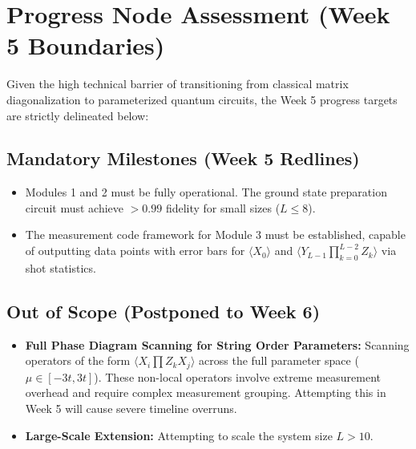 \documentclass[12pt, a4paper]{article}
\begin{document}
\section{Progress Node Assessment (Week 5 Boundaries)}
Given the high technical barrier of transitioning from classical matrix diagonalization to parameterized quantum circuits, the Week 5 progress targets are strictly delineated below:

\subsection{Mandatory Milestones (Week 5 Redlines)}
\begin{itemize}
    \item Modules 1 and 2 must be fully operational. The ground state preparation circuit must achieve $>0.99$ fidelity for small sizes ($L \le 8$).
    \item The measurement code framework for Module 3 must be established, capable of outputting data points with error bars for $\langle X_0 \rangle$ and $\langle Y_{L-1} \prod_{k=0}^{L-2} Z_k \rangle$ via shot statistics.
\end{itemize}

\subsection{Out of Scope (Postponed to Week 6)}
\begin{itemize}
    \item \textbf{Full Phase Diagram Scanning for String Order Parameters:} Scanning operators of the form $\langle X_i \prod Z_k X_j \rangle$ across the full parameter space ($\mu \in [-3t, 3t]$). These non-local operators involve extreme measurement overhead and require complex measurement grouping. Attempting this in Week 5 will cause severe timeline overruns.
    \item \textbf{Large-Scale Extension:} Attempting to scale the system size $L > 10$.
\end{itemize}
\end{document}
